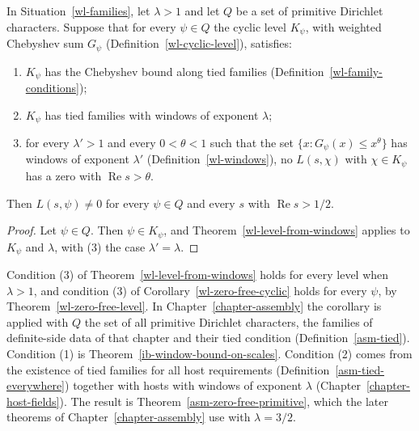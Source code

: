 \begin{corollary}\label{wl-zero-free-cyclic}
In Situation~\ref{wl-families}, let $\lambda>1$ and let $Q$ be a set of
primitive Dirichlet characters. Suppose that for every $\psi\in Q$ the cyclic
level $K_\psi$, with weighted Chebyshev sum $G_\psi$
(Definition~\ref{wl-cyclic-level}), satisfies:
\begin{enumerate}
\item $K_\psi$ has the Chebyshev bound along tied families
  (Definition~\ref{wl-family-conditions});
\item $K_\psi$ has tied families with windows of exponent $\lambda$;
\item for every $\lambda'>1$ and every $0<\theta<1$ such that the set
  $\{x:G_\psi(x)\leq x^\theta\}$ has windows of exponent $\lambda'$
  (Definition~\ref{wl-windows}), no $L(s,\chi)$ with $\chi\in K_\psi$ has a
  zero with $\operatorname{Re}s>\theta$.
\end{enumerate}
Then $L(s,\psi)\neq0$ for every $\psi\in Q$ and every $s$ with
$\operatorname{Re}s>1/2$.
\end{corollary}
\begin{proof}
Let $\psi\in Q$. Then $\psi\in K_\psi$, and Theorem~\ref{wl-level-from-windows}
applies to $K_\psi$ and $\lambda$, with (3) the case $\lambda'=\lambda$.
\end{proof}

\begin{remark}\label{wl-supply}
Condition (3) of Theorem~\ref{wl-level-from-windows} holds for every level
when $\lambda>1$, and condition (3) of Corollary~\ref{wl-zero-free-cyclic}
holds for every $\psi$, by Theorem~\ref{wl-zero-free-level}. In
Chapter~\ref{chapter-assembly} the corollary is applied with $Q$ the set of
all primitive Dirichlet characters, the families of definite-side data of
that chapter and their tied condition (Definition~\ref{asm-tied}).
Condition (1) is Theorem~\ref{ib-window-bound-on-scales}. Condition (2)
comes from the existence of tied families for all host requirements
(Definition~\ref{asm-tied-everywhere}) together with hosts with windows of
exponent $\lambda$ (Chapter~\ref{chapter-host-fields}). The result is
Theorem~\ref{asm-zero-free-primitive}, which the later theorems of
Chapter~\ref{chapter-assembly} use with $\lambda=3/2$.
\end{remark}
